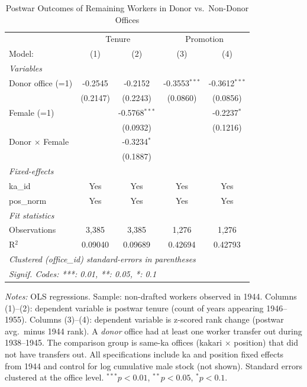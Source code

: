 \begin{table}[htbp]
\centering
\caption{Postwar Outcomes of Remaining Workers in Donor vs.\ Non-Donor Offices}
\label{tab:donor_postwar}
\begin{threeparttable}
\begin{tabular}{lcccc}
   \tabularnewline \midrule \midrule
    & \multicolumn{2}{c}{Tenure} & \multicolumn{2}{c}{Promotion} \\ 
   Model:                 & (1)      & (2)             & (3)             & (4)\\  
   \midrule
   \emph{Variables}\\
   Donor office (=1)      & -0.2545  & -0.2152         & -0.3553$^{***}$ & -0.3612$^{***}$\\   
                          & (0.2147) & (0.2243)        & (0.0860)        & (0.0856)\\   
   Female (=1)            &          & -0.5768$^{***}$ &                 & -0.2237$^{*}$\\   
                          &          & (0.0932)        &                 & (0.1216)\\   
   Donor $\times$ Female  &          & -0.3234$^{*}$   &                 &   \\   
                          &          & (0.1887)        &                 &   \\   
   \midrule
   \emph{Fixed-effects}\\
   ka\_id                 & Yes      & Yes             & Yes             & Yes\\  
   pos\_norm              & Yes      & Yes             & Yes             & Yes\\  
   \midrule
   \emph{Fit statistics}\\
   Observations           & 3,385    & 3,385           & 1,276           & 1,276\\  
   R$^2$                  & 0.09040  & 0.09689         & 0.42694         & 0.42793\\  
   \midrule \midrule
   \multicolumn{5}{l}{\emph{Clustered (office\_id) standard-errors in parentheses}}\\
   \multicolumn{5}{l}{\emph{Signif. Codes: ***: 0.01, **: 0.05, *: 0.1}}\\
\end{tabular}
\begin{tablenotes}[flushleft]
\footnotesize
\item \textit{Notes:} OLS regressions. Sample: non-drafted workers observed in 1944. Columns (1)--(2): dependent variable is postwar tenure (count of years appearing 1946--1955). Columns (3)--(4): dependent variable is z-scored rank change (postwar avg.\ minus 1944 rank). A \emph{donor} office had at least one worker transfer out during 1938--1945. The comparison group is same-ka offices (kakari $\times$ position) that did not have transfers out. All specifications include ka and position fixed effects from 1944 and control for log cumulative male stock (not shown). Standard errors clustered at the office level. $^{***}p<0.01$, $^{**}p<0.05$, $^{*}p<0.1$.
\end{tablenotes}
\end{threeparttable}
\end{table}
